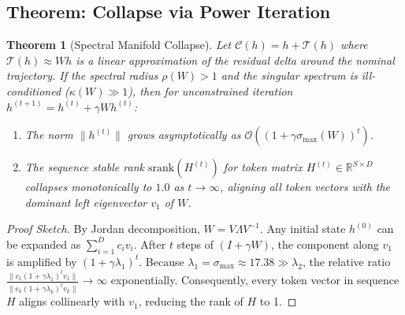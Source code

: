\documentclass[11pt,a4paper]{article}
\theoremstyle{plain}
\newtheorem{theorem}{Theorem}
\theoremstyle{definition}
\theoremstyle{remark}
\begin{document}
\subsection{Theorem: Collapse via Power Iteration}
\begin{theorem}[Spectral Manifold Collapse]
Let $\mathcal{C}(h) = h + \mathcal{T}(h)$ where $\mathcal{T}(h) \approx W h$ is a linear approximation of the residual delta around the nominal trajectory. If the spectral radius $\rho(W) > 1$ and the singular spectrum is ill-conditioned ($\kappa(W) \gg 1$), then for unconstrained iteration $h^{(t+1)} = h^{(t)} + \gamma W h^{(t)}$:
\begin{enumerate}
    \item The norm $\|h^{(t)}\|$ grows asymptotically as $\mathcal{O}((1 + \gamma \sigma_{\max}(W))^t)$.
    \item The sequence stable rank $\text{srank}(H^{(t)})$ for token matrix $H^{(t)} \in \mathbb{R}^{S \times D}$ collapses monotonically to $1.0$ as $t \to \infty$, aligning all token vectors with the dominant left eigenvector $v_1$ of $W$.
\end{enumerate}
\end{theorem}

\begin{proof}[Proof Sketch]
By Jordan decomposition, $W = V \Lambda V^{-1}$. Any initial state $h^{(0)}$ can be expanded as $\sum_{i=1}^D c_i v_i$. After $t$ steps of $(I + \gamma W)$, the component along $v_1$ is amplified by $(1 + \gamma \lambda_1)^t$. Because $\lambda_1 = \sigma_{\max} \approx 17.38 \gg \lambda_2$, the relative ratio $\frac{\|c_1 (1 + \gamma \lambda_1)^t v_1\|}{\|c_k (1 + \gamma \lambda_k)^t v_k\|} \to \infty$ exponentially. Consequently, every token vector in sequence $H$ aligns collinearly with $v_1$, reducing the rank of $H$ to 1.
\end{proof}
\end{document}
